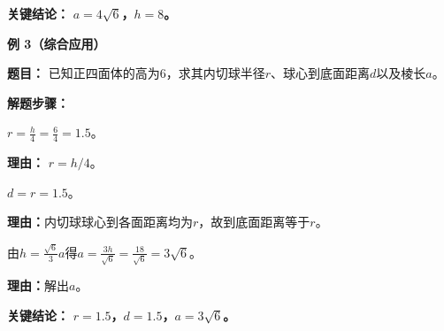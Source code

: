 \begin{examplebox}
	\textbf{\textcolor{CExample}{关键结论：}}
	\textbf{$a = 4\sqrt{6}$，$h = 8$。}

	\medskip
	\textbf{\textcolor{CExample}{例 3（综合应用）}}

	\textbf{\textcolor{CExample}{题目：}}
	已知正四面体的高为$6$，求其内切球半径$r$、球心到底面距离$d$以及棱长$a$。

	\textbf{\textcolor{CExample}{解题步骤：}}
	\begin{description}[style=nextline, leftmargin=2.8em, labelsep=0.5em, itemsep=0.45em]
		\item[\textbf{第一步（求内切球半径）：}] $r = \frac{h}{4} = \frac{6}{4} = 1.5$。
			\par\textbf{理由：} $r = h/4$。
		\item[\textbf{第二步（球心到底面距离）：}] $d = r = 1.5$。
			\par\textbf{理由：}内切球球心到各面距离均为$r$，故到底面距离等于$r$。
		\item[\textbf{第三步（反求棱长）：}] 由$h = \frac{\sqrt{6}}{3}a$得$a = \frac{3h}{\sqrt{6}} = \frac{18}{\sqrt{6}} = 3\sqrt{6}$。
			\par\textbf{理由：}解出$a$。
	\end{description}

	\textbf{\textcolor{CExample}{关键结论：}}
	\textbf{$r = 1.5$，$d = 1.5$，$a = 3\sqrt{6}$。}
\end{examplebox}
